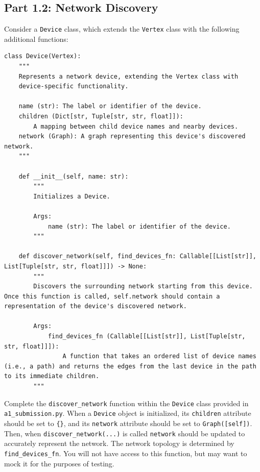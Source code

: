 \documentclass[12pt]{report}
\begin{document}
\clearpage
\subsection*{Part 1.2: Network Discovery}
Consider a \texttt{Device} class, which extends the \texttt{Vertex} class with the following additional functions:
\begin{lstlisting}
class Device(Vertex):
    """
    Represents a network device, extending the Vertex class with
    device-specific functionality.

    name (str): The label or identifier of the device.
    children (Dict[str, Tuple[str, str, float]]): 
        A mapping between child device names and nearby devices.
    network (Graph): A graph representing this device's discovered network.
    """

    def __init__(self, name: str):
        """
        Initializes a Device.

        Args:
            name (str): The label or identifier of the device.
        """

    def discover_network(self, find_devices_fn: Callable[[List[str]], List[Tuple[str, str, float]]]) -> None:
        """
        Discovers the surrounding network starting from this device. Once this function is called, self.network should contain a representation of the device's discovered network.

        Args:
            find_devices_fn (Callable[[List[str]], List[Tuple[str, str, float]]]): 
                A function that takes an ordered list of device names (i.e., a path) and returns the edges from the last device in the path to its immediate children.
        """
\end{lstlisting}
Complete the \texttt{discover\_network} function within the \texttt{Device} class provided in \texttt{a1\_submission.py}. When a \texttt{Device} object is initialized, its \texttt{children} attribute should be set to \texttt{\{\}}, and its \texttt{network} attribute should be set to \texttt{Graph([self])}. Then, when \texttt{discover\_network(...)} is called \texttt{network} should be updated to accurately represent the network. The network topology is determined by \texttt{find\_devices\_fn}. You will not have access to this function, but may want to mock it for the purposes of testing.
\end{document}
